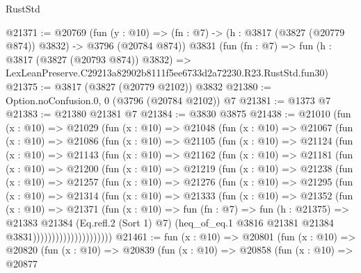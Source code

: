 \begin{lexlean}{RustStd}
\begin{coremodule}
@21371 := @20769
    (fun (y : @10) => (fn : @7) -> (h : @3817 (@3827 (@20779 @874)) @3832) -> @3796 (@20784 @874))
    @3831
    (fun (fn : @7) =>
    fun (h : @3817 (@3827 (@20793 @874)) @3832) =>
    LexLeanPreserve.C29213a82902b8111f5ee6733d2a72230.R23.RustStd.fun30)
@21375 := @3817 (@3827 (@20779 @2102)) @3832
@21380 := Option.noConfusion.{0, 0} (@3796 (@20784 @2102)) @7
@21381 := @1373 @7
@21383 := @21380 @21381 @7
@21384 := @3830 @3875
@21438 := @21010
    (fun (x : @10) =>
    @21029
      (fun (x : @10) =>
      @21048
        (fun (x : @10) =>
        @21067
          (fun (x : @10) =>
          @21086
            (fun (x : @10) =>
            @21105
              (fun (x : @10) =>
              @21124
                (fun (x : @10) =>
                @21143
                  (fun (x : @10) =>
                  @21162
                    (fun (x : @10) =>
                    @21181
                      (fun (x : @10) =>
                      @21200
                        (fun (x : @10) =>
                        @21219
                          (fun (x : @10) =>
                          @21238
                            (fun (x : @10) =>
                            @21257
                              (fun (x : @10) =>
                              @21276
                                (fun (x : @10) =>
                                @21295
                                  (fun (x : @10) =>
                                  @21314
                                    (fun (x : @10) =>
                                    @21333
                                      (fun (x : @10) =>
                                      @21352
                                        (fun (x : @10) =>
                                        @21371
                                          (fun (x : @10) =>
                                          fun (fn : @7) =>
                                          fun (h : @21375) =>
                                          @21383
                                            @21384
                                            (Eq.refl.{2} (Sort 1) @7)
                                            (heq_of_eq.{1}
                                              @3816
                                              @21381
                                              @21384
                                              @3831)))))))))))))))))))))
@21461 := fun (x : @10) =>
  @20801
    (fun (x : @10) =>
    @20820
      (fun (x : @10) =>
      @20839
        (fun (x : @10) =>
        @20858
          (fun (x : @10) =>
          @20877

\end{coremodule}
\end{lexlean}
